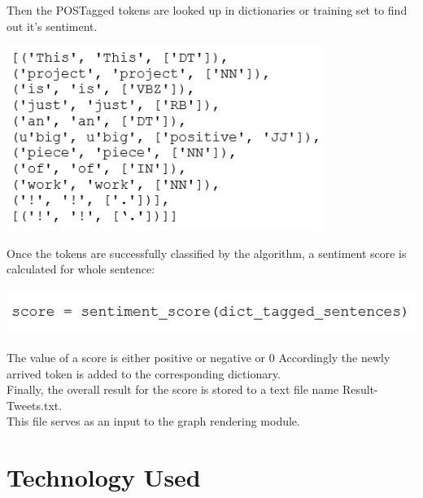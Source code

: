 \documentclass[a4paper,12pt]{report}
\begin{document}
\hspace*{\parindent}Then the POSTagged tokens are looked up in dictionaries or training set to find out it’s sentiment.
\begin{center}
	\includegraphics[height=6cm]{images/5.jpg}
\end{center}
\hspace*{\parindent}Once the tokens are successfully classified by the algorithm, a sentiment score is calculated for whole sentence:
\begin{center}
	\includegraphics[height=1.5cm]{images/6.jpg}
\end{center}
\hspace*{\parindent}The value of a score is either positive or negative or 0 Accordingly the newly arrived token is added to the corresponding dictionary.\\
\hspace*{\parindent}Finally, the overall result for the score is stored to a text file name Result-Tweets.txt.\\
This file serves as an input to the graph rendering module.


\chapter{Technology Used}
\end{document}
